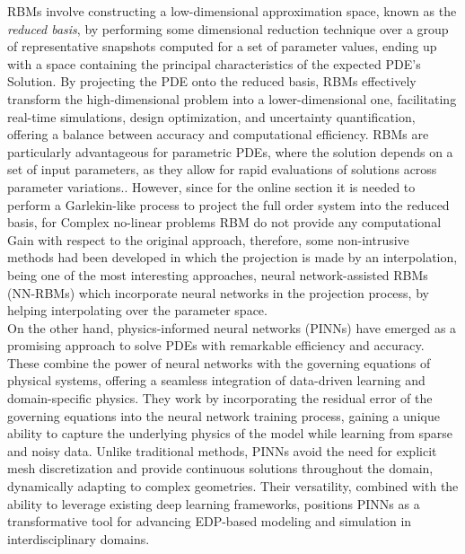 \documentclass[12pt,letterpaper]{article}
\begin{document}
RBMs involve constructing a low-dimensional approximation space, known as the \textit{reduced basis}, by performing some dimensional reduction technique over a group of representative snapshots computed for a set of parameter values, ending up with a space containing the principal characteristics of the expected PDE's Solution\cite{benner2017model}. By projecting the PDE onto the reduced basis, RBMs effectively transform the high-dimensional problem into a lower-dimensional one, facilitating real-time simulations, design optimization, and uncertainty quantification, offering a balance between accuracy and computational efficiency. RBMs are particularly advantageous for parametric PDEs, where the solution depends on a set of input parameters, as they allow for rapid evaluations of solutions across parameter variations.\cite{quarteroni2015reduced}. However, since for the online section it is needed to perform a Garlekin-like process to project the full order system into the reduced basis, for Complex no-linear problems RBM do not provide any computational Gain with respect to the original approach, therefore, some non-intrusive methods had been developed in which the projection is made by an interpolation, being one of the most interesting approaches, neural network-assisted RBMs (NN-RBMs) which incorporate  neural networks in the projection process, by helping interpolating over the parameter space\cite{hesthaven2018non}. \\

On the other hand, physics-informed neural networks (PINNs) have emerged as a promising approach to solve PDEs with remarkable efficiency and accuracy. These combine the power of neural networks with the governing equations of physical systems, offering a seamless integration of data-driven learning and domain-specific physics. They work by incorporating the residual error of the governing equations into the neural network training process, gaining a unique ability to capture the underlying physics of the model while learning from sparse and noisy data. \cite{raissi2019physics} Unlike traditional methods, PINNs avoid the need for explicit mesh discretization and provide continuous solutions throughout the domain, dynamically adapting to complex geometries. Their versatility, combined with the ability to leverage existing deep learning frameworks, positions PINNs as a transformative tool for advancing EDP-based modeling and simulation in interdisciplinary domains.\\
\end{document}
